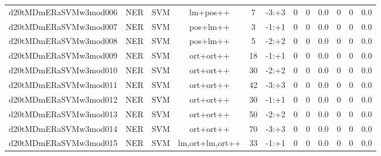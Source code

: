 \documentclass[a4paper]{article}
\begin{document}
\begin{landscape}
\begin{center}
\begin{tabular}{ |c|c|c|c|c|c|c|c|c|c|c|c|}
 
 	
 	\small{ d20tMDmERaSVMw3mod006 } & \small{ NER} & \small{  SVM }  & lm+pos++  &  7 &  \small{  -3:+3 }  &  0 & 0 & 0.0  &  0 & 0 & 0.0 \\
 	

 
 	
 	\small{ d20tMDmERaSVMw3mod007 } & \small{ NER} & \small{  SVM }  & pos+lm++  &  3 &  \small{  -1:+1 }  &  0 & 0 & 0.0  &  0 & 0 & 0.0 \\
 	

 
 	
 	\small{ d20tMDmERaSVMw3mod008 } & \small{ NER} & \small{  SVM }  & pos+lm++  &  5 &  \small{  -2:+2 }  &  0 & 0 & 0.0  &  0 & 0 & 0.0 \\
 	

 
 	
 	\small{ d20tMDmERaSVMw3mod009 } & \small{ NER} & \small{  SVM }  & ort+ort++  &  18 &  \small{  -1:+1 }  &  0 & 0 & 0.0  &  0 & 0 & 0.0 \\
 	

 
 	
 	\small{ d20tMDmERaSVMw3mod010 } & \small{ NER} & \small{  SVM }  & ort+ort++  &  30 &  \small{  -2:+2 }  &  0 & 0 & 0.0  &  0 & 0 & 0.0 \\
 	

 
 	
 	\small{ d20tMDmERaSVMw3mod011 } & \small{ NER} & \small{  SVM }  & ort+ort++  &  42 &  \small{  -3:+3 }  &  0 & 0 & 0.0  &  0 & 0 & 0.0 \\
 	

 
 	
 	\small{ d20tMDmERaSVMw3mod012 } & \small{ NER} & \small{  SVM }  & ort+ort++  &  30 &  \small{  -1:+1 }  &  0 & 0 & 0.0  &  0 & 0 & 0.0 \\
 	

 
 	
 	\small{ d20tMDmERaSVMw3mod013 } & \small{ NER} & \small{  SVM }  & ort+ort++  &  50 &  \small{  -2:+2 }  &  0 & 0 & 0.0  &  0 & 0 & 0.0 \\
 	

 
 	
 	\small{ d20tMDmERaSVMw3mod014 } & \small{ NER} & \small{  SVM }  & ort+ort++  &  70 &  \small{  -3:+3 }  &  0 & 0 & 0.0  &  0 & 0 & 0.0 \\
 	

 
 	
 	\small{ d20tMDmERaSVMw3mod015 } & \small{ NER} & \small{  SVM }  & lm,ort+lm,ort++  &  33 &  \small{  -1:+1 }  &  0 & 0 & 0.0  &  0 & 0 & 0.0 \\
 	


\end{tabular}
\end{center}
\end{landscape}
\end{document}
